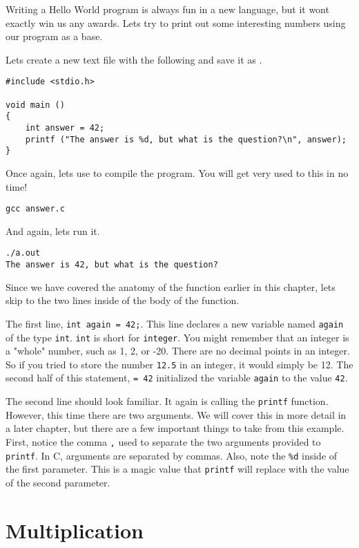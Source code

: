 Writing a Hello World program is always fun in a new language, but it wont
exactly win us any awards. Lets try to print out some interesting numbers
using our program as a base.

Lets create a new text file with the following and save it as .

\begin{Verbatim}
#include <stdio.h>

void main ()
{
    int answer = 42;
    printf ("The answer is %d, but what is the question?\n", answer);
}
\end{Verbatim}

Once again, lets use  to compile the program. You will get very
used to this in no time!

\begin{Verbatim}
gcc answer.c
\end{Verbatim}

And again, lets run it.

\begin{Verbatim}
./a.out
The answer is 42, but what is the question?
\end{Verbatim}

Since we have covered the anatomy of the  function earlier in this
chapter, lets skip to the two lines inside of the body of the function.

The first line, \verb|int again = 42;|. This line declares a new variable named
\verb|again| of the type \verb|int|. \verb|int| is short for \verb|integer|.
You might remember that an integer is a "whole" number, such as 1, 2, or -20.
There are no decimal points in an integer. So if you tried to store the number
\verb|12.5| in an integer, it would simply be 12. The second half of this
statement, \verb|= 42| initialized the variable \verb|again| to the value
\verb|42|.

The second line should look familiar. It again is calling the \verb|printf|
function. However, this time there are two arguments. We will cover this in
more detail in a later chapter, but there are a few important things to take
from this example. First, notice the comma \verb|,| used to separate the
two arguments provided to \verb|printf|. In C, arguments are separated by
commas. Also, note the \verb|%d| inside of the first parameter. This is a
magic value that \verb|printf| will replace with the value of the second
parameter.

\section{Multiplication}

